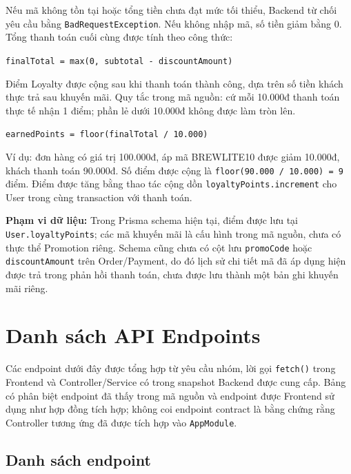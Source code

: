Nếu mã không tồn tại hoặc tổng tiền chưa đạt mức tối thiểu, Backend từ chối yêu cầu bằng \texttt{BadRequestException}. Nếu không nhập mã, số tiền giảm bằng 0. Tổng thanh toán cuối cùng được tính theo công thức:

\begin{center}
\texttt{finalTotal = max(0, subtotal - discountAmount)}
\end{center}

Điểm Loyalty được cộng sau khi thanh toán thành công, dựa trên số tiền khách thực trả sau khuyến mãi. Quy tắc trong mã nguồn: cứ mỗi 10.000đ thanh toán thực tế nhận 1 điểm; phần lẻ dưới 10.000đ không được làm tròn lên.

\begin{center}
\texttt{earnedPoints = floor(finalTotal / 10.000)}
\end{center}

Ví dụ: đơn hàng có giá trị 100.000đ, áp mã BREWLITE10 được giảm 10.000đ, khách thanh toán 90.000đ. Số điểm được cộng là \texttt{floor(90.000 / 10.000) = 9} điểm. Điểm được tăng bằng thao tác cộng dồn \texttt{loyaltyPoints.increment} cho User trong cùng transaction với thanh toán.

\textbf{Phạm vi dữ liệu:} Trong Prisma schema hiện tại, điểm được lưu tại \texttt{User.loyaltyPoints}; các mã khuyến mãi là cấu hình trong mã nguồn, chưa có thực thể Promotion riêng. Schema cũng chưa có cột lưu \texttt{promoCode} hoặc \texttt{discountAmount} trên Order/Payment, do đó lịch sử chi tiết mã đã áp dụng hiện được trả trong phản hồi thanh toán, chưa được lưu thành một bản ghi khuyến mãi riêng.

\section{Danh sách API Endpoints}
\label{sec:api-endpoints}

Các endpoint dưới đây được tổng hợp từ yêu cầu nhóm, lời gọi \texttt{fetch()} trong Frontend và Controller/Service có trong snapshot Backend được cung cấp. Bảng có phân biệt endpoint đã thấy trong mã nguồn và endpoint được Frontend sử dụng như hợp đồng tích hợp; không coi endpoint contract là bằng chứng rằng Controller tương ứng đã được tích hợp vào \texttt{AppModule}.

\subsection{Danh sách endpoint}

